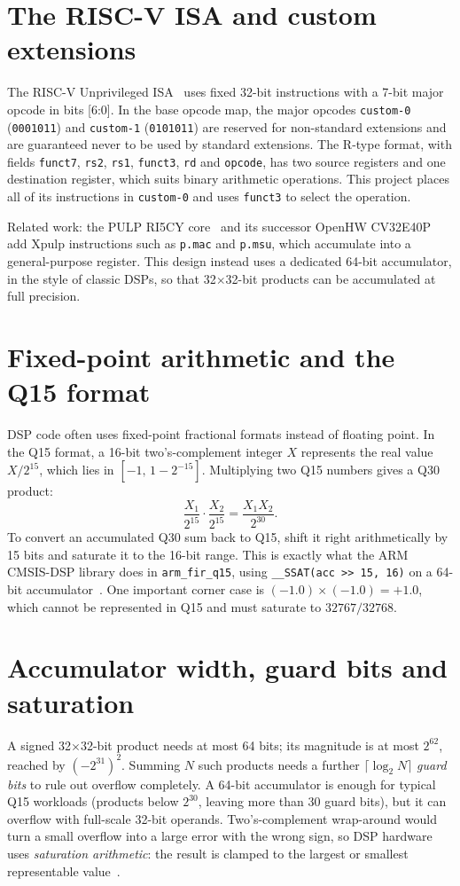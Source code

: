 \documentclass[11pt,a4paper]{report}
\newcommand{\code}[1]{\texttt{#1}}
\begin{document}
\section{The RISC-V ISA and custom extensions}
The RISC-V Unprivileged ISA~\cite{riscv} uses fixed 32-bit instructions with
a 7-bit major opcode in bits [6:0]. In the base opcode map, the major opcodes
\code{custom-0} (\code{0001011}) and \code{custom-1} (\code{0101011}) are
reserved for non-standard extensions and are guaranteed never to be used by
standard extensions. The R-type format, with fields \code{funct7}, \code{rs2},
\code{rs1}, \code{funct3}, \code{rd} and \code{opcode}, has two source
registers and one destination register, which suits binary arithmetic
operations. This project places all of its instructions in \code{custom-0}
and uses \code{funct3} to select the operation.

Related work: the PULP RI5CY core~\cite{gautschi} and its successor OpenHW
CV32E40P~\cite{cv32e40p} add Xpulp instructions such as \code{p.mac} and
\code{p.msu}, which accumulate into a general-purpose register. This design
instead uses a dedicated 64-bit accumulator, in the style of classic DSPs,
so that 32$\times$32-bit products can be accumulated at full precision.

\section{Fixed-point arithmetic and the Q15 format}
DSP code often uses fixed-point fractional formats instead of floating point.
In the Q15 format, a 16-bit two's-complement integer $X$ represents the real
value $X/2^{15}$, which lies in $[-1,\,1-2^{-15}]$. Multiplying two Q15
numbers gives a Q30 product:
\begin{equation}
  \frac{X_1}{2^{15}}\cdot\frac{X_2}{2^{15}} = \frac{X_1 X_2}{2^{30}}.
\end{equation}
To convert an accumulated Q30 sum back to Q15, shift it right arithmetically
by 15 bits and saturate it to the 16-bit range. This is exactly what the ARM
CMSIS-DSP library does in \code{arm\_fir\_q15}, using
\code{\_\_SSAT(acc >> 15, 16)} on a 64-bit accumulator~\cite{cmsis}. One
important corner case is $(-1.0)\times(-1.0)=+1.0$, which cannot be
represented in Q15 and must saturate to $32767/32768$.

\section{Accumulator width, guard bits and saturation}
A signed 32$\times$32-bit product needs at most 64 bits; its magnitude is at
most $2^{62}$, reached by $(-2^{31})^2$. Summing $N$ such products needs a
further $\lceil\log_2 N\rceil$ \emph{guard bits} to rule out overflow
completely. A 64-bit accumulator is enough for typical Q15 workloads (products
below $2^{30}$, leaving more than 30 guard bits), but it can overflow with
full-scale 32-bit operands. Two's-complement wrap-around would turn a small
overflow into a large error with the wrong sign, so DSP hardware uses
\emph{saturation arithmetic}: the result is clamped to the largest or smallest
representable value~\cite{lyons}.
\end{document}
